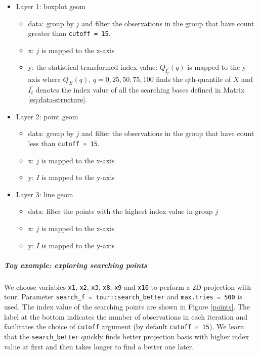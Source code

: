 \documentclass[12pt]{article}
\providecommand{\tightlist}{%
  \setlength{\itemsep}{0pt}\setlength{\parskip}{0pt}}
\begin{document}
\begin{itemize}
\tightlist
\item
  Layer 1: boxplot geom

  \begin{itemize}
  \tightlist
  \item
    data: group by \(j\) and filter the observations in the group that
    have count greater than \texttt{cutoff\ =\ 15}.
  \item
    x: \(j\) is mapped to the x-axis
  \item
    y: the statistical transformed index value: \(Q_{I^{\prime}_t}(q)\)
    is mapped to the y-axis where \(Q_X(q)\), \(q = 0, 25, 50, 75, 100\)
    finds the qth-quantile of \(X\) and \(I^{\prime}_t\) denotes the
    index value of all the searching bases defined in Matrix
    \ref{eq:data-structure}.
  \end{itemize}
\item
  Layer 2: point geom

  \begin{itemize}
  \tightlist
  \item
    data: group by \(j\) and filter the observations in the group that
    have count less than \texttt{cutoff\ =\ 15}.
  \item
    x: \(j\) is mapped to the x-axis
  \item
    y: \(I\) is mapped to the y-axis
  \end{itemize}
\item
  Layer 3: line geom

  \begin{itemize}
  \tightlist
  \item
    data: filter the points with the highest index value in group \(j\)
  \item
    x: \(j\) is mapped to the x-axis
  \item
    y: \(I\) is mapped to the y-axis
  \end{itemize}
\end{itemize}

\hypertarget{toy-example-exploring-searching-points}{%
\subparagraph{Toy example: exploring searching
points}\label{toy-example-exploring-searching-points}}

We choose variables \texttt{x1}, \texttt{x2}, \texttt{x3}, \texttt{x8},
\texttt{x9} and \texttt{x10} to perform a 2D projection with tour.
Parameter \texttt{search\_f\ =\ tour::search\_better} and
\texttt{max.tries\ =\ 500} is used. The index value of the searching
points are shown in Figure \ref{points}. The label at the bottom
indicates the number of observations in each iteration and facilitates
the choice of \texttt{cutoff} argument (by default
\texttt{cutoff\ =\ 15}). We learn that the \texttt{search\_better}
quickly finds better projection basis with higher index value at first
and then takes longer to find a better one later.
\end{document}
